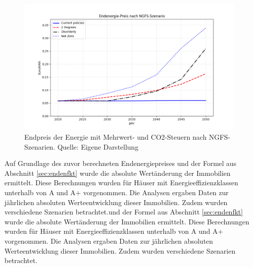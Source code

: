 \begin{figure}[htbp]
    \centering
    \includegraphics[width=\textwidth]{figures/endpreis.png}
    \caption{Endpreis der Energie mit Mehrwert- und CO2-Steuern nach NGFS-Szenarien. Quelle: Eigene Darstellung}
    \label{fig:endpreis_energie}
\end{figure}
\FloatBarrier

Auf Grundlage des zuvor berechneten Endenergiepreises und der Formel aus Abschnitt \ref{sec:endenfkt} wurde die absolute Wertänderung der Immobilien ermittelt. Diese Berechnungen wurden für Häuser mit Energieeffizienzklassen unterhalb von A und A+ vorgenommen. Die Analysen ergaben Daten zur jährlichen absoluten Werteentwicklung dieser Immobilien. Zudem wurden verschiedene Szenarien betrachtet.und der Formel aus Abschnitt \ref{sec:endenfkt} wurde die absolute Wertänderung der Immobilien ermittelt. Diese Berechnungen wurden für Häuser mit Energieeffizienzklassen unterhalb von A und A+ vorgenommen. Die Analysen ergaben Daten zur jährlichen absoluten Werteentwicklung dieser Immobilien. Zudem wurden verschiedene Szenarien betrachtet.

